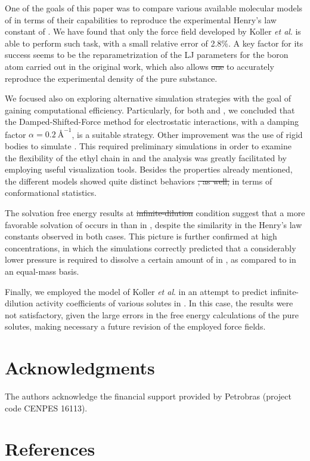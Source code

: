 \documentclass[3p,twocolumn]{elsarticle}
\providecommand{\DIFadd}[1]{{\protect\color{blue}\uwave{#1}}} %
\providecommand{\DIFdel}[1]{{\protect\color{red}\sout{#1}}}                      %
\providecommand{\DIFaddbegin}{} %
\providecommand{\DIFaddend}{} %
\providecommand{\DIFdelbegin}{} %
\providecommand{\DIFdelend}{} %
\newcommand{\DIFscaledelfig}{0.5}
\newlength{\DIFdelgraphicswidth} %
\newlength{\DIFdelgraphicsheight} %
\newcommand{\DIFaddincludegraphics}[2][]{{\color{blue}\fbox{\DIFOincludegraphics[#1]{#2}}}} %
\newcommand{\DIFdelincludegraphics}[2][]{%
\sbox{\DIFdelgraphicsbox}{\DIFOincludegraphics[#1]{#2}}%
\settoboxwidth{\DIFdelgraphicswidth}{\DIFdelgraphicsbox} %
\settoboxtotalheight{\DIFdelgraphicsheight}{\DIFdelgraphicsbox} %
\scalebox{\DIFscaledelfig}{%
\parbox[b]{\DIFdelgraphicswidth}{\usebox{\DIFdelgraphicsbox}\\[-\baselineskip] \rule{\DIFdelgraphicswidth}{0em}}\llap{\resizebox{\DIFdelgraphicswidth}{\DIFdelgraphicsheight}{%
\setlength{\unitlength}{\DIFdelgraphicswidth}%
\begin{picture}(1,1)%
\thicklines\linethickness{2pt} %
{\color[rgb]{1,0,0}\put(0,0){\framebox(1,1){}}}%
{\color[rgb]{1,0,0}\put(0,0){\line( 1,1){1}}}%
{\color[rgb]{1,0,0}\put(0,1){\line(1,-1){1}}}%
\end{picture}%
}\hspace*{3pt}}} %
} %
\DeclareRobustCommand{\DIFaddbegin}{\DIFOaddbegin \let\includegraphics\DIFaddincludegraphics} %
\DeclareRobustCommand{\DIFaddend}{\DIFOaddend \let\includegraphics\DIFOincludegraphics} %
\DeclareRobustCommand{\DIFdelbegin}{\DIFOdelbegin \let\includegraphics\DIFdelincludegraphics} %
\DeclareRobustCommand{\DIFdelend}{\DIFOaddend \let\includegraphics\DIFOincludegraphics} %
\begin{document}
One of the goals of this paper was to compare various available molecular models of \ce{[emim][B(CN)_4]} in terms of their capabilities to reproduce the experimental Henry's law constant of .
We have found that only the force field developed by Koller \textit{et al}. \cite{Koller_2012} is able to perform such task, with a small relative error of 2.8\%.
A key factor for its success seems to be the reparametrization of the LJ parameters for the boron atom carried out in the original work, which also allows \DIFdelbegin \DIFdel{one }\DIFdelend \DIFaddbegin \DIFadd{us }\DIFaddend to accurately reproduce the experimental density of the pure substance.

We focused also on exploring alternative simulation strategies with the goal of gaining computational efficiency.
Particularly, for both \ce{[emim][B(CN)_4]} and \ce{[emim][NTf_2]}, we concluded that the Damped-Shifted-Force method for electrostatic interactions, with a damping factor $\alpha = 0.2 ~\text{\AA}^{-1}$, is a suitable strategy.
Other improvement was the use of rigid bodies to simulate \ce{[emim][B(CN)_4]}.
This required preliminary simulations in order to examine the flexibility of the ethyl chain in \ce{[emim]^+} and the analysis was greatly facilitated by employing useful visualization tools.
Besides the properties already mentioned, the different models showed quite distinct behaviors \DIFdelbegin \DIFdel{, as well, }\DIFdelend in terms of conformational statistics.

The solvation free energy results at \DIFdelbegin \DIFdel{infinite-dilution }\DIFdelend \DIFaddbegin \DIFadd{infinite dilution }\DIFaddend condition suggest that a more favorable solvation of  occurs in \ce{[emim][B(CN)_4]} than in \ce{[emim][NTf_2]}, despite the similarity in the Henry's law constants observed in both cases.
This picture is further confirmed at high  concentrations, in which the simulations correctly predicted that a considerably lower pressure is required to dissolve a certain amount of  in \ce{[emim][B(CN)_4]}, as compared to \ce{[emim][NTf_2]} in an equal-mass basis.

Finally, we employed the model of Koller \textit{et al}. \cite{Koller_2012} in an attempt to predict infinite-dilution activity coefficients of various solutes in \ce{[emim][B(CN)_4]}.
In this case, the results were not satisfactory, given the large errors in the free energy calculations of the pure solutes, making necessary a future revision of the employed force fields.

\section*{Acknowledgments}

The authors acknowledge the financial support provided by Petrobras (project code CENPES 16113). 

\section*{References}


\end{document}
